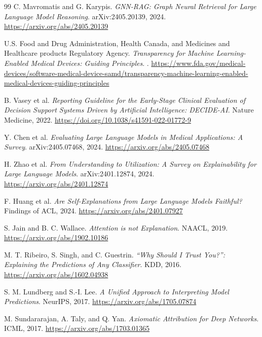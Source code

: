 \begin{thebibliography}{99}
C. Mavromatis and G. Karypis.
\newblock \textit{GNN-RAG: Graph Neural Retrieval for Large Language Model Reasoning}.
\newblock arXiv:2405.20139, 2024.
\newblock \url{https://arxiv.org/abs/2405.20139}

U.S. Food and Drug Administration, Health Canada, and Medicines and Healthcare products Regulatory Agency.
\newblock \textit{Transparency for Machine Learning-Enabled Medical Devices: Guiding Principles}.
.
\newblock \url{https://www.fda.gov/medical-devices/software-medical-device-samd/transparency-machine-learning-enabled-medical-devices-guiding-principles}

B. Vasey et al.
\newblock \textit{Reporting Guideline for the Early-Stage Clinical Evaluation of Decision Support Systems Driven by Artificial Intelligence: DECIDE-AI}.
\newblock Nature Medicine, 2022.
\newblock \url{https://doi.org/10.1038/s41591-022-01772-9}

Y. Chen et al.
\newblock \textit{Evaluating Large Language Models in Medical Applications: A Survey}.
\newblock arXiv:2405.07468, 2024.
\newblock \url{https://arxiv.org/abs/2405.07468}

H. Zhao et al.
\newblock \textit{From Understanding to Utilization: A Survey on Explainability for Large Language Models}.
\newblock arXiv:2401.12874, 2024.
\newblock \url{https://arxiv.org/abs/2401.12874}

F. Huang et al.
\newblock \textit{Are Self-Explanations from Large Language Models Faithful?}
\newblock Findings of ACL, 2024.
\newblock \url{https://arxiv.org/abs/2401.07927}

S. Jain and B. C. Wallace.
\newblock \textit{Attention is not Explanation}.
\newblock NAACL, 2019.
\newblock \url{https://arxiv.org/abs/1902.10186}

M. T. Ribeiro, S. Singh, and C. Guestrin.
\newblock \textit{``Why Should I Trust You?'': Explaining the Predictions of Any Classifier}.
\newblock KDD, 2016.
\newblock \url{https://arxiv.org/abs/1602.04938}

S. M. Lundberg and S.-I. Lee.
\newblock \textit{A Unified Approach to Interpreting Model Predictions}.
\newblock NeurIPS, 2017.
\newblock \url{https://arxiv.org/abs/1705.07874}

M. Sundararajan, A. Taly, and Q. Yan.
\newblock \textit{Axiomatic Attribution for Deep Networks}.
\newblock ICML, 2017.
\newblock \url{https://arxiv.org/abs/1703.01365}


\end{thebibliography}

